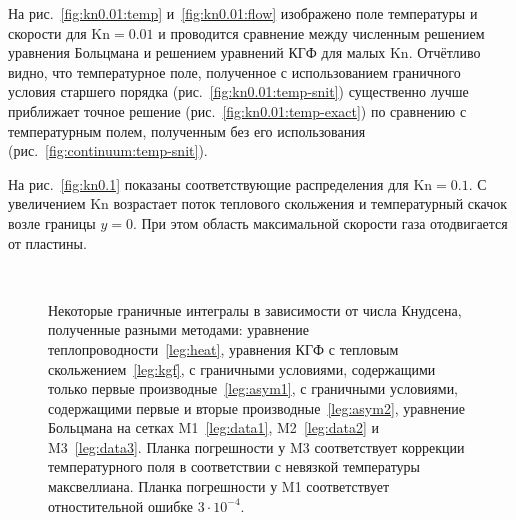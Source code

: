 \documentclass[
aps,%
12pt,%
final,%
notitlepage,%
oneside,%
onecolumn,%
nobibnotes,%
nofootinbib,%
superscriptaddress,%
noshowpacs,%
showkeys,%
tightenlines,%
centertags]%
{revtex4}
\newcommand{\Kn}{\mathrm{Kn}}
\begin{document}
На рис.~\ref{fig:kn0.01:temp} и~\ref{fig:kn0.01:flow} изображено поле температуры и скорости
для \(\Kn=0.01\) и проводится сравнение между численным решением уравнения Больцмана
и решением уравнений КГФ для малых \(\Kn\).
Отчётливо видно, что температурное поле, полученное с использованием
граничного условия старшего порядка (рис.~\ref{fig:kn0.01:temp-snit})
существенно лучше приближает точное решение (рис.~\ref{fig:kn0.01:temp-exact})
по сравнению с температурным полем, полученным без его использования (рис.~\ref{fig:continuum:temp-snit}).

На рис.~\ref{fig:kn0.1} показаны соответствующие распределения для \(\Kn=0.1\).
С увеличением \(\Kn\) возрастает поток теплового скольжения и температурный скачок возле границы \(y=0\).
При этом область максимальной скорости газа отодвигается от пластины.

\begin{figure}
    \centering
    \\
    \caption{
        Некоторые граничные интегралы в зависимости от числа Кнудсена, полученные разными методами:
        уравнение теплопроводности~\ref{leg:heat},
        уравнения КГФ с тепловым скольжением~\ref{leg:kgf},
        с граничными условиями, содержащими только первые производные~\ref{leg:asym1},
        с граничными условиями, содержащими первые и вторые производные~\ref{leg:asym2},
        уравнение Больцмана на сетках M1~\ref{leg:data1}, M2~\ref{leg:data2} и M3~\ref{leg:data3}.
        Планка погрешности у M3 соответствует коррекции температурного поля в соответствии
        с невязкой температуры максвеллиана.
        Планка погрешности у M1 соответствует отностительной ошибке \(3\cdot10^{-4}\).
    }
    \label{fig:comparison}
\end{figure}
\end{document}
